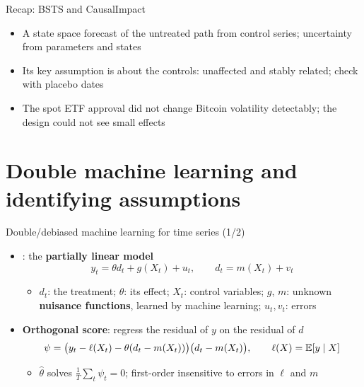 \begin{frame}{Recap: BSTS and CausalImpact}
\itemsize{\small}
\begin{itemize}
    \item A state space forecast of the untreated path from control series; uncertainty from parameters and states
    \item Its key assumption is about the controls: unaffected and stably related; check with placebo dates
    \item The spot ETF approval did not change Bitcoin volatility detectably; the design could not see small effects
\end{itemize}
\end{frame}


\section{Double machine learning and identifying assumptions}

\begin{frame}{Double/debiased machine learning for time series (1/2)}
\itemsize{\small}
\begin{itemize}
    \item {}: the \textbf{partially linear model} \[ y_t = \theta d_t + g(X_t) + u_t, \qquad d_t = m(X_t) + v_t \]
    \begin{itemize}
        \item $d_t$: the treatment; $\theta$: its effect; $X_t$: control variables; $g$, $m$: unknown \textbf{nuisance functions}, learned by machine learning; $u_t, v_t$: errors
    \end{itemize}
    \item \textbf{Orthogonal score}: regress the residual of $y$ on the residual of $d$ \[ \psi = \big(y_t - \ell(X_t) - \theta(d_t - m(X_t))\big)\big(d_t - m(X_t)\big), \qquad \ell(X) = \mathbb{E}[y\mid X] \]
    \begin{itemize}
        \item $\hat\theta$ solves $\frac1T\sum_t\psi_t = 0$; first-order insensitive to errors in $\ell$ and $m$
    \end{itemize}
\end{itemize}
\end{frame}


